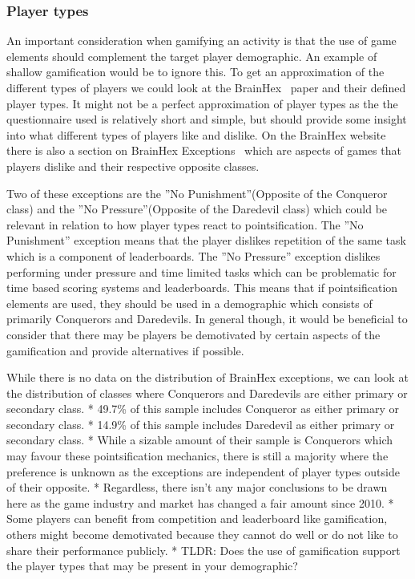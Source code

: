 \subsubsection{Player types}
An important consideration when gamifying an activity is that the use of game elements should complement the target player demographic. An example of shallow gamification would be to ignore this. To get an approximation of the different types of players we could look at the BrainHex~\cite{nacke2014brainhex} paper and their defined player types. It might not be a perfect approximation of player types as the the questionnaire used is relatively short and simple, but should provide some insight into what different types of players like and dislike. On the BrainHex website there is also a section on BrainHex Exceptions~\cite{brainhexexceptions} which are aspects of games that players dislike and their respective opposite classes. 

Two of these exceptions are the ''No Punishment''(Opposite of the Conqueror class) and the ''No Pressure''(Opposite of the Daredevil class) which could be relevant in relation to how player types react to pointsification. The ''No Punishment'' exception means that the player dislikes repetition of the same task which is a component of leaderboards. The ''No Pressure'' exception dislikes performing under pressure and time limited tasks which can be problematic for time based scoring systems and leaderboards. This means that if pointsification elements are used, they should be used in a demographic which consists of primarily Conquerors and Daredevils. In general though, it would be beneficial to consider that there may be players be demotivated by certain aspects of the gamification and provide alternatives if possible. 

While there is no data on the distribution of BrainHex exceptions, we can look at the distribution of classes where Conquerors and Daredevils are either primary or secondary class. 
            * 49.7\% of this sample includes Conqueror as either primary or secondary class.  
            * 14.9\% of this sample includes Daredevil as either primary or secondary class. 
            * While a sizable amount of their sample is Conquerors which may favour these pointsification mechanics, there is still a majority where the preference is unknown as the exceptions are independent of player types outside of their opposite. 
        * Regardless, there isn't any major conclusions to be drawn here as the game industry and market has changed a fair amount since 2010.
    * Some players can benefit from competition and leaderboard like gamification, others might become demotivated because they cannot do well or do not like to share their performance publicly. 
    * TLDR: Does the use of gamification support the player types that may be present in your demographic?
\fi

